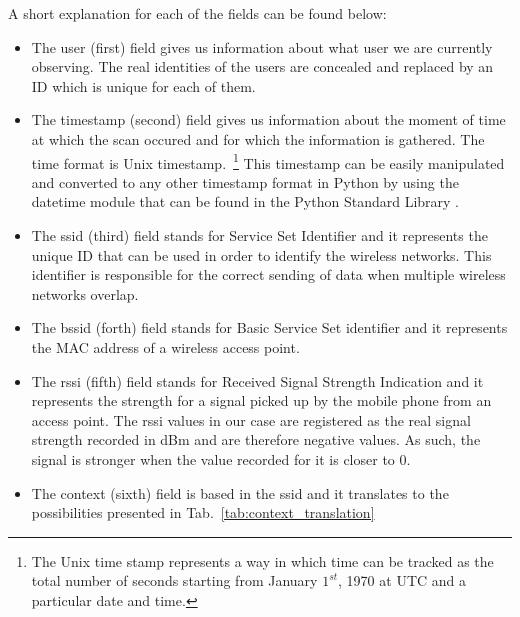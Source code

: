 A short explanation for each of the fields can be found below:
\begin{itemize}
\item The user (first) field gives us information about what user we are
currently observing. The real identities of the users are concealed and replaced by an ID
which is unique for each of them.
\item The timestamp (second) field gives us information about the moment of time
at which the scan occured and for which the information is gathered. The time
format is Unix timestamp.~\footnote{The Unix time stamp represents a way in
which time can be tracked as the total number of seconds starting from January
$1^{st}$, 1970 at UTC and a particular date and time.} This timestamp can be
easily manipulated and converted to any other timestamp format in Python by
using the datetime module that can be found in the Python Standard Library
\cite{PSL}.
\item The ssid (third) field stands for Service Set Identifier and it represents
the unique ID that can be used in order to identify the wireless networks. This
identifier is responsible for the correct sending of data when multiple wireless
networks overlap.
\item The bssid (forth) field stands for Basic Service Set identifier and it
represents the MAC address of a wireless access point.
\item The rssi (fifth) field stands for Received Signal Strength Indication and
it represents the strength for a signal picked up by the mobile phone from an
access point. The rssi values in our case are registered as the real signal
strength recorded in dBm and are therefore negative values. As such, the signal
is stronger when the value recorded for it is closer to $0$.
\item The context (sixth) field is based in the ssid and it translates to the
possibilities presented in Tab.~\ref{tab:context_translation}
\end{itemize}

